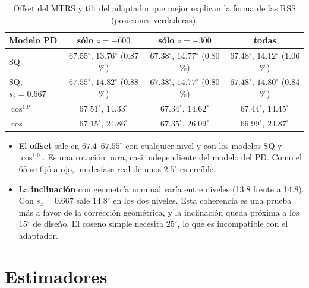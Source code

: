 \documentclass[11pt,a4paper]{article}
\begin{document}
\begin{table}[H]\centering\small
\begin{tabular}{lccc}\toprule
Modelo PD & sólo $z=-600$ & sólo $z=-300$ & todas\\\midrule
SQ & $67.55^\circ$, $13.76^\circ$ (0.87 \%) & $67.38^\circ$, $14.77^\circ$ (0.80 \%) & $67.48^\circ$, $14.12^\circ$ (1.06 \%)\\
SQ, $s_z=0.667$ & $67.55^\circ$, $\mathbf{14.82^\circ}$ (0.88 \%) & $67.38^\circ$, $\mathbf{14.77^\circ}$ (0.80 \%) & $67.48^\circ$, $14.80^\circ$ (0.84 \%)\\
$\cos^{1.9}$ & $67.51^\circ$, $14.33^\circ$ & $67.34^\circ$, $14.62^\circ$ & $67.44^\circ$, $14.45^\circ$\\
$\cos$ & $67.15^\circ$, $24.86^\circ$ & $67.35^\circ$, $26.09^\circ$ & $66.99^\circ$, $24.87^\circ$\\\bottomrule
\end{tabular}
\caption{Offset del MTRS y tilt del adaptador que mejor explican la forma de las RSS (posiciones verdaderas).}
\end{table}
\begin{itemize}
\item El \textbf{offset} sale en $67.4$--$67.55^\circ$ con cualquier nivel y con los modelos SQ y $\cos^{1.9}$. Es una rotación pura, casi independiente del modelo del PD. Como el 65 se fijó a ojo, un desfase real de unos $2.5^\circ$ es creíble.
\item La \textbf{inclinación} con geometría nominal varía entre niveles (13.8 frente a 14.8). Con $s_z=0.667$ sale $14.8^\circ$ en los dos niveles. Esta coherencia es una prueba más a favor de la corrección geométrica, y la inclinación queda próxima a los $15^\circ$ de diseño. El coseno simple necesita $25^\circ$, lo que es incompatible con el adaptador.
\end{itemize}

\section{Estimadores}
\end{document}
